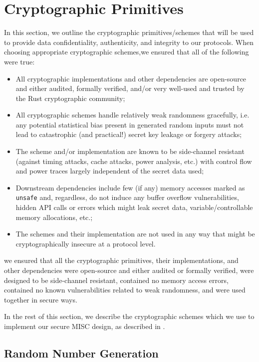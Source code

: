 \section{Cryptographic Primitives}
\label{sec:crypto-primitives}

In this section, we outline the cryptographic primitives/schemes that will be used to provide data confidentiality, authenticity, and integrity to our protocols. When choosing appropriate cryptographic schemes,\iflong we ensured that all of the following were true:
\begin{itemize}
    \item All cryptographic implementations and other dependencies are open-source and either audited, formally verified, and/or very well-used and trusted by the Rust cryptographic community;
    \item All cryptographic schemes handle relatively weak randomness gracefully, i.e. any potential statistical bias present in generated random inputs must not lead to catastrophic (and practical!) secret key leakage or forgery attacks;
    \item The scheme and/or implementation are known to be side-channel resistant (against timing attacks, cache attacks, power analysis, etc.) with control flow and power traces largely independent of the secret data used;
    \item Downstream dependencies include few (if any) memory accesses marked as \texttt{unsafe} and, regardless, do not induce any buffer overflow vulnerabilities, hidden API calls or errors which might leak secret data, variable/controllable memory allocations, etc.;
    \item The schemes and their implementation are not used in any way that might be cryptographically insecure at a protocol level.
\end{itemize}
\else
we ensured that all the cryptographic primitives, their implementations, and other dependencies were open-source and either audited or formally verified, were designed to be side-channel resistant, contained no memory access errors, contained no known vulnerabilities related to weak randomness, and were used together in secure ways.
\fi

In the rest of this section, we describe the cryptographic schemes which we use to implement our secure MISC design, as described in .

\subsection{Random Number Generation}


